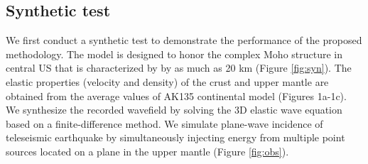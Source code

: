 \subsection*{Synthetic test}
We first conduct a synthetic test to demonstrate the performance of the proposed methodology. The model is designed to honor  the complex Moho structure in central US \cite{schmandt2015distinct} that is characterized by  by as much as 20 km (Figure \ref{fig:syn}).  The elastic properties (velocity and density) of the crust and upper mantle are obtained from the average values of AK135 continental model\cite{kennett1995constraints} (Figures 1a-1c).  We synthesize the recorded wavefield by solving the 3D elastic wave equation based on a finite-difference method. We simulate plane-wave incidence of teleseismic earthquake by simultaneously injecting energy from multiple point sources located on a plane in the upper mantle (Figure \ref{fig:obs}). %

